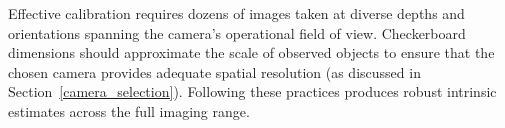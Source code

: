 \documentclass[../main.tex]{subfiles}
\begin{document}
Effective calibration requires dozens of images taken at diverse depths and orientations spanning the camera’s operational field of view.  
Checkerboard dimensions should approximate the scale of observed objects to ensure that the chosen camera provides adequate spatial resolution (as discussed in Section~\ref{camera_selection}).  
Following these practices produces robust intrinsic estimates across the full imaging range.

\end{document}
